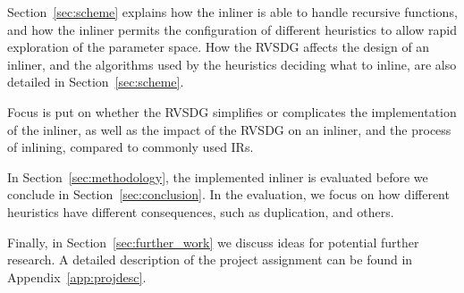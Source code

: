 Section~\ref{sec:scheme} explains how the inliner is able to handle recursive
functions, and how the inliner permits the configuration of different heuristics
to allow rapid exploration of the parameter space. How the RVSDG affects the
design of an inliner, and the algorithms used by the heuristics deciding what to
inline, are also detailed in Section~\ref{sec:scheme}.


Focus is put on whether the RVSDG simplifies or complicates the implementation
of the inliner, as well as the impact of the RVSDG on an inliner, and the
process of inlining, compared to
commonly used IRs.

In Section~\ref{sec:methodology}, the implemented inliner is evaluated
before we conclude in Section~\ref{sec:conclusion}. In the evaluation, we focus
on how different heuristics have different consequences, such as
 duplication, and others.

Finally, in Section~\ref{sec:further_work} we discuss ideas for potential
further research. A detailed description of the project assignment can be found
in Appendix~\ref{app:projdesc}.
